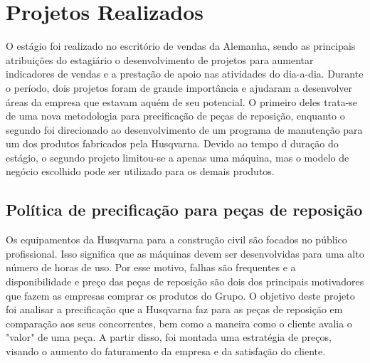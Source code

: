 \documentclass[12pt]{article}
\begin{document}

\section{Projetos Realizados}

	O estágio foi realizado no escritório de vendas da Alemanha, sendo as principais atribuições do estagiário o desenvolvimento de projetos para aumentar indicadores de vendas e a prestação de apoio nas atividades do dia-a-dia. Durante o período, dois projetos foram de grande importância e ajudaram a desenvolver áreas da empresa que estavam aquém de seu potencial. O primeiro deles trata-se de uma nova metodologia para precificação de peças de reposição, enquanto o segundo foi direcionado ao desenvolvimento de um programa de manutenção para um dos produtos fabricados pela Husqvarna. Devido ao tempo d duração do estágio, o segundo projeto limitou-se a apenas uma máquina, mas o modelo de negócio escolhido pode ser utilizado para os demais produtos.

\subsection{Política de precificação para peças de reposição}

	Os equipamentos da Husqvarna para a construção civil são focados no público profissional. Isso significa que as máquinas devem ser desenvolvidas para uma alto número de horas de uso. Por esse motivo, falhas são frequentes e a disponibilidade e preço das peças de reposição são dois dos principais motivadores que fazem as empresas comprar os produtos do Grupo. O objetivo deste projeto foi analisar a precificação que a Husqvarna faz para as peças de reposição em comparação aos seus concorrentes, bem como a maneira como o cliente avalia o "valor" de uma peça. A partir disso, foi montada uma estratégia de preços, visando o aumento do faturamento da empresa e da satisfação do cliente.
\end{document}
